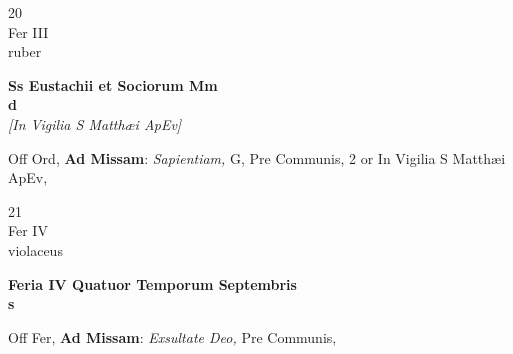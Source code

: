 \documentclass[10pt, openany]{book}
\begin{document}
        \begin{center}
            \begin{minipage}{3.5in}
                \vspace{2em}
                \begin{minipage}{0.5in}
                    {\Huge 20} \\
                    {\normalsize Fer III} \\
                    {\normalsize ruber}
                \end{minipage}
                \begin{minipage}{3.0in}
                    \textbf{ \large Ss Eustachii et Sociorum Mm \\
                    \textnormal{\normalsize d}} \\ \textit{[In Vigilia S Matthæi ApEv]} \\ 
                \end{minipage}
                \begin{justify}Off Ord, \textbf{Ad Missam}: \textit{Sapientiam,} G, Pre Communis, 2 or In Vigilia S Matthæi ApEv,   
                \end{justify}
            \end{minipage}
        \end{center}
    
        \begin{center}
            \begin{minipage}{3.5in}
                \vspace{2em}
                \begin{minipage}{0.5in}
                    {\Huge 21} \\
                    {\normalsize Fer IV} \\
                    {\normalsize violaceus}
                \end{minipage}
                \begin{minipage}{3.0in}
                    \textbf{ \large Feria IV Quatuor Temporum Septembris \\
                    \textnormal{\normalsize s}} \\ 
                \end{minipage}
                \begin{justify}Off Fer, \textbf{Ad Missam}: \textit{Exsultate Deo,} Pre Communis,   
                \end{justify}
            \end{minipage}
        \end{center}
    
\end{document}
